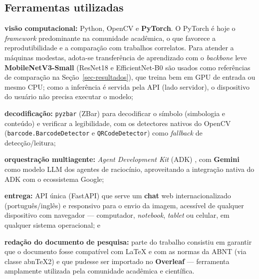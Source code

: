 \documentclass[
	article,			%
	11pt,				%
	oneside,			%
	a4paper,			%
	english,			%
	brazilian,			%
	sumario=tradicional
	]{abntex2}
\begin{document}
\subsection{Ferramentas utilizadas}

\begin{alineas}
	\item \textbf{visão computacional:} Python, OpenCV e \textbf{PyTorch}. O
	PyTorch é hoje o \textit{framework} predominante na comunidade acadêmica, o
	que favorece a reprodutibilidade e a comparação com trabalhos correlatos. Para
	atender a máquinas modestas, adota-se transferência de aprendizado com o
	\textit{backbone} leve \textbf{MobileNetV3-Small} (ResNet18 e EfficientNet-B0 são
	usados como referências de comparação na Seção~\ref{sec-resultados}),
	que treina bem em GPU de entrada ou mesmo CPU; como a inferência é servida pela
	API (lado servidor), o dispositivo do usuário não precisa executar o modelo;
	\item \textbf{decodificação:} \texttt{pyzbar} (ZBar) para decodificar o
	símbolo (simbologia e conteúdo) e verificar a legibilidade, com os detectores
	nativos do OpenCV (\texttt{barcode.BarcodeDetector} e \texttt{QRCodeDetector})
	como \textit{fallback} de detecção/leitura;
	\item \textbf{orquestração multiagente:} \textit{Agent Development Kit} (ADK)
	\cite{google_adk_blog}, com \textbf{Gemini} como modelo LLM dos agentes de
	raciocínio, aproveitando a integração nativa do ADK com o ecossistema Google;
	\item \textbf{entrega:} API única (FastAPI) que serve um \textbf{chat} web
	internacionalizado (português/inglês) e responsivo para o envio da imagem,
	acessível de qualquer dispositivo com navegador --- computador,
	\textit{notebook}, \textit{tablet} ou celular, em qualquer sistema operacional;
	e
	\item \textbf{redação do documento de pesquisa:} parte do trabalho consistiu em
	garantir que o documento fosse compatível com \LaTeX{} e com as normas da ABNT
	(via classe abnTeX2) e que pudesse ser importado no \textbf{Overleaf} ---
	ferramenta amplamente utilizada pela comunidade acadêmica e científica.
\end{alineas}
\end{document}
